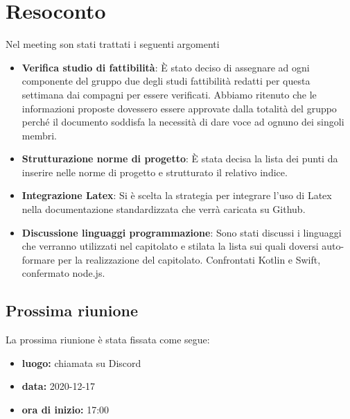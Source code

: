 \section{Resoconto}
Nel meeting son stati trattati i seguenti argomenti
	\begin{itemize}
		\item\textbf{Verifica studio di fattibilità}:
		È stato deciso di assegnare ad ogni componente del gruppo due degli studi fattibilità redatti per questa settimana dai compagni per essere verificati. Abbiamo ritenuto che le informazioni proposte dovessero essere approvate dalla totalità del gruppo perché il documento soddisfa la necessità di dare voce ad ognuno dei singoli membri.
		\item\textbf{Strutturazione norme di progetto}:
		È stata decisa la lista dei punti da inserire nelle norme di progetto e strutturato il relativo indice.
		\item\textbf{Integrazione Latex}:
		Si è scelta la strategia per integrare l’uso di Latex nella documentazione standardizzata che verrà caricata su Github.
		\item\textbf{Discussione linguaggi programmazione}:
		Sono stati discussi i linguaggi che verranno utilizzati nel capitolato e stilata la lista sui quali doversi auto-formare per la realizzazione del capitolato.
		Confrontati Kotlin e Swift, confermato node.js. 
	\end{itemize}

\subsection{Prossima riunione}
La prossima riunione è stata fissata come segue:
\begin{itemize}
	\item \textbf{luogo:} chiamata su Discord
	\item \textbf{data:} 2020-12-17
	\item \textbf{ora di inizio:} 17:00
\end{itemize}



